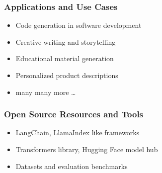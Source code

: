 \begin{frame}[fragile]\frametitle{Applications and Use Cases}

\begin{itemize}
\item Code generation in software development
\item Creative writing and storytelling
\item Educational material generation
\item Personalized product descriptions
\item many many more \ldots
\end{itemize}	

\end{frame}


\begin{frame}[fragile]\frametitle{Open Source Resources and Tools}

\begin{itemize}
\item LangChain, LlamaIndex like frameworks
\item Transformers library, Hugging Face model hub
\item Datasets and evaluation benchmarks
\end{itemize}	

\end{frame}

